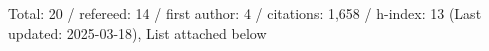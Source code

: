 Total: 20 / refereed: 14 / first author: 4 / citations: 1,658 / h-index: 13 (Last updated: 2025-03-18), List attached below